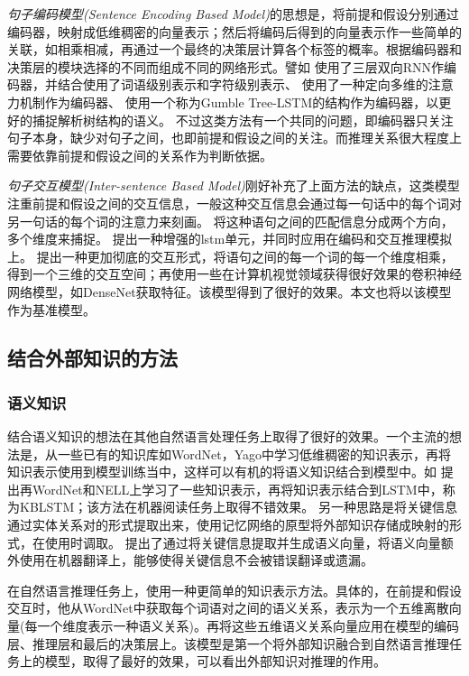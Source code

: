 \documentclass[UTF8,11pt,a4paper,nofonts]{ctexart}
\begin{document}
\textit{句子编码模型(Sentence Encoding Based Model)}\cite{}的思想是，将前提和假设分别通过编码器，映射成低维稠密的向量表示；然后将编码后得到的向量表示作一些简单的关联，如相乘相减，再通过一个最终的决策层计算各个标签的概率。根据编码器和决策层的模块选择的不同而组成不同的网络形式。譬如
\cite{Chen2017Recurrent}使用了三层双向RNN作编码器，并结合使用了词语级别表示和字符级别表示、
\cite{Shen2017DiSAN}使用了一种定向多维的注意力机制作为编码器、
\cite{Gumble}使用一个称为Gumble Tree-LSTM的结构作为编码器，以更好的捕捉解析树结构的语义。
不过这类方法有一个共同的问题，即编码器只关注句子本身，缺少对句子之间，也即前提和假设之间的关注。而推理关系很大程度上需要依靠前提和假设之间的关系作为判断依据。


\textit{句子交互模型(Inter-sentence Based Model)}刚好补充了上面方法的缺点，这类模型注重前提和假设之间的交互信息，一般这种交互信息会通过每一句话中的每个词对另一句话的每个词的注意力来刻画。
\cite{Wang2017Bilateral}将这种语句之间的匹配信息分成两个方向，多个维度来捕捉。
\cite{Enhanced}提出一种增强的lstm单元，并同时应用在编码和交互推理模拟上。
\cite{Diin}提出一种更加彻底的交互形式，将语句之间的每一个词的每一个维度相乘，得到一个三维的交互空间；再使用一些在计算机视觉领域获得很好效果的卷积神经网络模型，如DenseNet\cite{}获取特征。该模型得到了很好的效果。本文也将以该模型作为基准模型。




\subsection{结合外部知识的方法}

\subsubsection{语义知识}

结合语义知识的想法在其他自然语言处理任务上取得了很好的效果。一个主流的想法是，从一些已有的知识库如WordNet，Yago中学习低维稠密的知识表示，再将知识表示使用到模型训练当中，这样可以有机的将语义知识结合到模型中。如
\cite{}提出再WordNet和NELL上学习了一些知识表示，再将知识表示结合到LSTM中，称为KBLSTM；该方法在机器阅读任务上取得不错效果。
另一种思路是将关键信息通过实体关系对的形式提取出来，使用记忆网络的原型将外部知识存储成映射的形式，在使用时调取。
\cite{}提出了通过将关键信息提取并生成语义向量，将语义向量额外使用在机器翻译上，能够使得关键信息不会被错误翻译或遗漏。

在自然语言推理任务上，\cite{}使用一种更简单的知识表示方法。具体的，在前提和假设交互时，他从WordNet中获取每个词语对之间的语义关系，表示为一个五维离散向量(每一个维度表示一种语义关系)。再将这些五维语义关系向量应用在模型的编码层、推理层和最后的决策层上。该模型是第一个将外部知识融合到自然语言推理任务上的模型，取得了最好的效果，可以看出外部知识对推理的作用。
\end{document}
